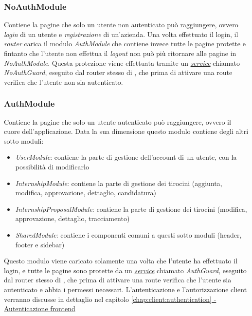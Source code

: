 \subsubsection{NoAuthModule}
\label{client:no-auth-module}
Contiene la pagine che solo un utente non autenticato può raggiungere, ovvero \textit{login} di un utente e \textit{registrazione} di un'azienda. Una volta effettuato il login, il \textit{router} carica il modulo \textit{AuthModule} che contiene invece tutte le pagine protette e fintanto che l'utente non effettua il \textit{logout} non può più ritornare alle pagine in \textit{NoAuthModule}. Questa protezione viene effettuata tramite un \hyperref[chap:client:services]{\textit{service}} chiamato \textit{NoAuthGuard}, eseguito dal router stesso di \angular, che prima di attivare una route verifica che l'utente non sia autenticato.


\subsubsection{AuthModule}
\label{client:auth-module}
Contiene la pagine che solo un utente autenticato può raggiungere, ovvero il cuore dell'applicazione. Data la sua dimensione questo modulo contiene degli altri sotto moduli:
\begin{itemize}
	\item \textit{UserModule}: contiene la parte di gestione dell'account di un utente, con la possibilità di modificarlo
	\item \textit{InternshipModule}: contiene la parte di gestione dei tirocini (aggiunta, modifica, approvazione, dettaglio, candidatura)
	\item \textit{InternshipProposalModule}: contiene la parte di gestione dei tirocini (modifica, approvazione, dettaglio, tracciamento)
	\item \textit{SharedModule}: contiene i componenti comuni a questi sotto moduli (header, footer e sidebar)
\end{itemize}

\noindent
Questo modulo viene caricato solamente una volta che l'utente ha effettuato il login, e tutte le pagine sono protette da un \hyperref[chap:client:services]{\textit{service}} chiamato \textit{AuthGuard}, eseguito dal router stesso di \angular, che prima di attivare una route verifica che l'utente sia autenticato e abbia i permessi necessari. L'autenticazione e l'autorizzazione client verranno discusse in dettaglio nel capitolo \hyperref[chap:client:authentication]{\ref{chap:client:authentication} - Autenticazione \gls{frontend}}


